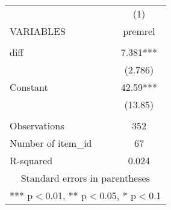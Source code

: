 \documentclass[]{article}
\begin{document}
\begin{tabular}{lc} \hline
 & (1) \\
VARIABLES & premrel \\ \hline
 &  \\
diff & 7.381*** \\
 & (2.786) \\
Constant & 42.59*** \\
 & (13.85) \\
 &  \\
Observations & 352 \\
Number of item\_id & 67 \\
 R-squared & 0.024 \\ \hline
\multicolumn{2}{c}{ Standard errors in parentheses} \\
\multicolumn{2}{c}{ *** p$<$0.01, ** p$<$0.05, * p$<$0.1} \\
\end{tabular}
\end{document}
